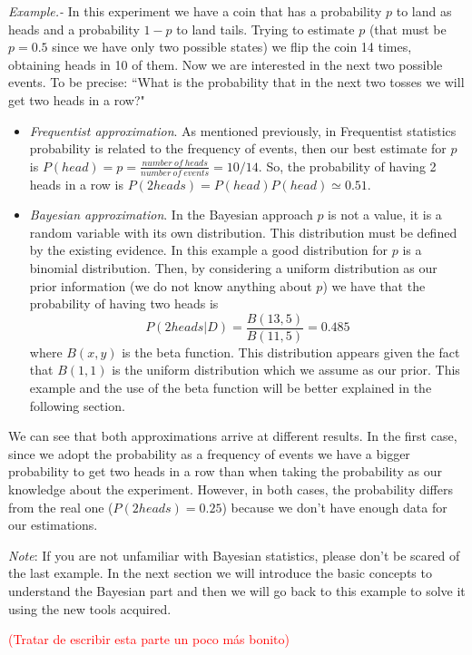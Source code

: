 \documentclass[onecolumn,           %
               showpacs,            %
               preprintnumbers,     %
               aps,                 %
               letterpaper,             %
               superscriptaddress,      %
               nofootinbib,         %
               tightenlines,        %
               floats,floatfix      %
               ,usenatbib,
               ]{revtex4-1}
\begin{document}
\textit{Example.-} In this experiment we have a coin that has a probability $p$ to land as heads and a probability $1-p$ to land tails. Trying to estimate $p$ (that must be $p=0.5$ since we have only two possible states) we flip the coin 14 times, obtaining heads in 10 of them. Now we are interested in the next two possible events. To be precise: ``What is the probability that in the next two tosses we will get two heads in a row?"
\begin{itemize}
\item \textit{Frequentist approximation}. As mentioned previously, in Frequentist statistics probability is related to the frequency of events, then our best estimate for $p$ is $P(head)=p=\frac{number \: of\: heads}{number\: of\: events}=10/14$. So, the probability of having 2 heads in a row is $P(2heads)=P(head)P(head)\simeq 0.51$.  
\item \textit{Bayesian approximation}. In the Bayesian approach $p$ is not a value, it is a random variable with its own distribution. This distribution must be defined by the existing evidence. In this example a good distribution for $p$ is a binomial distribution. Then, by considering a uniform distribution as our prior information (we do not know anything about $p$) we have that the probability of having two heads is
\[
P(2heads|D)=\frac{B(13,5)}{B(11,5)}=0.485
\]
where $B(x,y)$ is the beta function. This distribution appears given the fact that $B(1,1)$ is the uniform distribution which we assume as our prior. This example and the use of the beta function will be better explained in the following section. 
\end{itemize}

We can see that both approximations arrive at different results. In the first case, since we adopt the probability as a frequency of events we have a bigger probability to get two heads in a row than when taking the probability as our knowledge about the experiment. However, in both cases, the probability differs from the real one ($P(2heads)=0.25$) because we don't have enough data for our estimations.

\textit{Note}: If you are not unfamiliar with Bayesian statistics, please don't be scared of the last example. In the next section we will introduce the basic concepts to understand the Bayesian part and then we will go back to this example to solve it using the new tools acquired.   

\textcolor{red}{(Tratar de escribir esta parte un poco m\'as bonito)}
\end{document}
